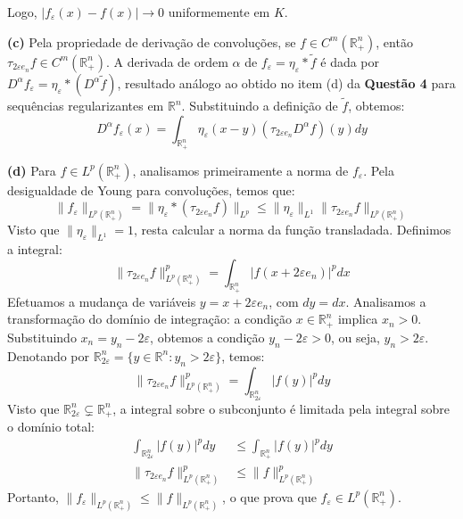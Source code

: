 \documentclass[cs_edp_2026.1.tex]{subfiles} %
\begin{document}
{	Logo, $|f_\varepsilon(x) - f(x)| \to 0$ uniformemente em $K$.
	
	\textbf{(c)} Pela propriedade de derivação de convoluções, se $f \in C^m(\mathbb{R}^n_+)$, então $\tau_{2\varepsilon e_n} f \in C^m(\mathbb{R}^n_+)$. A derivada de ordem $\alpha$ de $f_\varepsilon = \eta_\varepsilon * \tilde{f}$ é dada por $D^\alpha f_\varepsilon = \eta_\varepsilon * (D^\alpha \tilde{f})$, resultado análogo ao obtido no item (d) da \textbf{Questão 4} para sequências regularizantes em $\mathbb{R}^n$. Substituindo a definição de $\tilde{f}$, obtemos:
	$$\boxed{D^\alpha f_\varepsilon(x) = \int_{\mathbb{R}^n_+} \eta_\varepsilon(x-y) (\tau_{2\varepsilon e_n} D^\alpha f)(y) dy}$$
	
	\textbf{(d)} Para $f \in L^p(\mathbb{R}^n_+)$, analisamos primeiramente a norma de $f_\varepsilon$. Pela desigualdade de Young para convoluções, temos que:
	$$\|f_\varepsilon\|_{L^p(\mathbb{R}^n_+)} = \|\eta_\varepsilon * (\tau_{2\varepsilon e_n} f)\|_{L^p} \le \|\eta_\varepsilon\|_{L^1} \|\tau_{2\varepsilon e_n} f\|_{L^p(\mathbb{R}^n_+)}$$
	Visto que $\|\eta_\varepsilon\|_{L^1} = 1$, resta calcular a norma da função transladada. Definimos a integral:
	$$\|\tau_{2\varepsilon e_n} f\|_{L^p(\mathbb{R}^n_+)}^p = \int_{\mathbb{R}^n_+} |f(x + 2\varepsilon e_n)|^p dx$$
	Efetuamos a mudança de variáveis $y = x + 2\varepsilon e_n$, com $dy = dx$. Analisamos a transformação do domínio de integração: a condição $x \in \mathbb{R}^n_+$ implica $x_n > 0$. Substituindo $x_n = y_n - 2\varepsilon$, obtemos a condição $y_n - 2\varepsilon > 0$, ou seja, $y_n > 2\varepsilon$. Denotando por $\mathbb{R}^n_{2\varepsilon} = \{y \in \mathbb{R}^n : y_n > 2\varepsilon\}$, temos:
	$$\|\tau_{2\varepsilon e_n} f\|_{L^p(\mathbb{R}^n_+)}^p = \int_{\mathbb{R}^n_{2\varepsilon}} |f(y)|^p dy$$
	Visto que $\mathbb{R}^n_{2\varepsilon} \subsetneq \mathbb{R}^n_+$, a integral sobre o subconjunto é limitada pela integral sobre o domínio total:
	\begin{align*}
		\int_{\mathbb{R}^n_{2\varepsilon}} |f(y)|^p dy &\le \int_{\mathbb{R}^n_+} |f(y)|^p dy \\
		\|\tau_{2\varepsilon e_n} f\|_{L^p(\mathbb{R}^n_+)}^p &\le \|f\|_{L^p(\mathbb{R}^n_+)}^p
	\end{align*}
	Portanto, $\|f_\varepsilon\|_{L^p(\mathbb{R}^n_+)} \le \|f\|_{L^p(\mathbb{R}^n_+)}$, o que prova que $f_\varepsilon \in L^p(\mathbb{R}^n_+)$.
	
}
\end{document}
